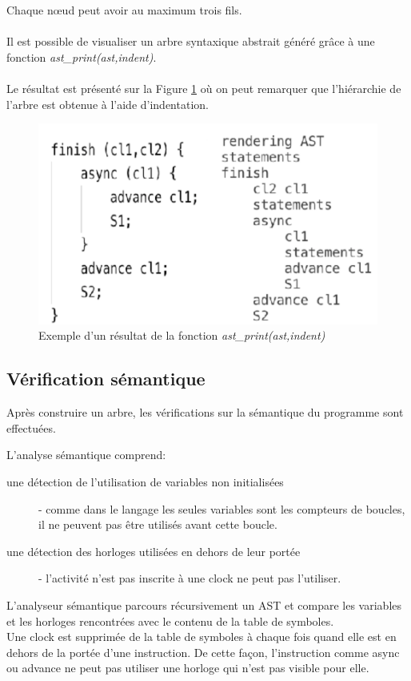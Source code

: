 \documentclass[12pt]{scrartcl}
\begin{document}
Chaque nœud peut avoir au maximum trois fils. \\\\ Il est possible de visualiser un arbre syntaxique abstrait généré grâce à une fonction \textit{ast\_print(ast,indent)}. 
\\\\Le résultat est présenté sur la Figure \ref{fig:ast} où on peut remarquer que l'hiérarchie de l'arbre est obtenue à l'aide d'indentation.
\begin{figure}[h]
  \includegraphics[scale=0.5]{ast_exemple}
  \centering
  \caption{Exemple d'un résultat de la fonction \textit{ast\_print(ast,indent)}}
  \centering
  \label{fig:ast}
\end{figure}

\newpage

\subsection{Vérification sémantique}
Après construire un arbre, les vérifications sur la sémantique du programme sont effectuées. 

L'analyse sémantique comprend: 


\begin{description}
  \item[une détection de l'utilisation de variables non initialisées] - comme dans le langage les seules variables sont les compteurs de boucles, il ne peuvent pas être utilisés avant cette boucle.
  \item[une détection des horloges utilisées en dehors de leur portée] - l'activité n'est pas inscrite à une clock ne peut pas l'utiliser.
\end{description}

L'analyseur sémantique parcours récursivement un AST et compare les variables et les horloges rencontrées avec le contenu de la table de symboles.\\
Une clock est supprimée de la table de symboles à chaque fois quand elle est en dehors de la portée d'une instruction. De cette façon, l'instruction comme async ou advance ne peut pas utiliser 
une horloge qui n'est pas visible pour elle.
\end{document}
